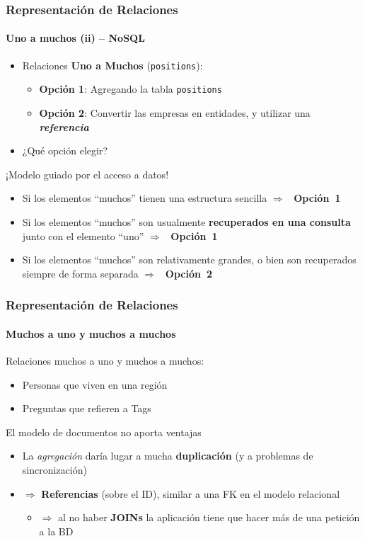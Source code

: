 \documentclass[14pt]{beamer}
\newcommand{\ra}{{\color{blue} $\Rightarrow${}~{}}}
\begin{document}
\begin{frame}[allowframebreaks]
  \frametitle{Representación de Relaciones}
\framesubtitle{Uno a muchos (ii) -- NoSQL}
\begin{itemize}
\item Relaciones {\bf Uno a Muchos} ({\tt positions}):
  \begin{itemize}
  \item {\bf Opción 1}: Agregando la tabla {\tt positions}
  \item {\bf Opción 2}: Convertir las empresas en entidades, y utilizar una
    {\bfseries\itshape referencia}
  \end{itemize}
\item ¿Qué opción elegir?
\end{itemize}

\framebreak

\begin{alertblock}{¡Modelo guiado por el acceso a datos!}
\begin{small}
  \begin{itemize}
  \item Si los elementos ``muchos'' tienen una estructura sencilla
    \ra{} {\bf Opción~1}
\item Si los elementos ``muchos'' son usualmente {\bf recuperados en una
    consulta} junto con el elemento ``uno'' \ra{} {\bf Opción~1}
\item Si los elementos ``muchos'' son relativamente grandes, o bien son
  recuperados siempre de forma separada \ra{} {\bf Opción~2}
  \end{itemize}
\end{small}
\end{alertblock}
\end{frame}

\begin{frame}
  \frametitle{Representación de Relaciones}
  \framesubtitle{Muchos a uno y muchos a muchos}
Relaciones muchos a uno y muchos a muchos:
    \begin{itemize}
    \item Personas que viven en una región
\item Preguntas que refieren a Tags
    \end{itemize}
El modelo de documentos no aporta ventajas
  \begin{itemize}
  \item La {\em agregación} daría lugar a mucha {\bf duplicación} (y a
  problemas de sincronización)

\item {\color{red} $\Rightarrow$} {\bf Referencias} (sobre el ID), similar
  a una FK en el modelo relacional
\begin{itemize}
  \item {\color{red} $\Rightarrow$} al no haber {\bf JOINs} la aplicación
    tiene que hacer más de una petición a la BD
  \end{itemize}
\end{itemize}
\end{frame}
\end{document}
